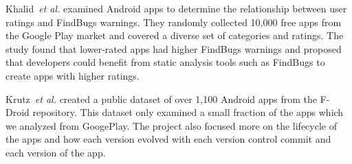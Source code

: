 




Khalid~\emph{et al.}\cite{7006337} examined Android apps to determine the relationship between user ratings and FindBugs warnings. They randomly collected 10,000 free apps from the Google Play market and covered a diverse set of categories and ratings. The study found that lower-rated apps had higher FindBugs warnings and proposed that developers could benefit from static analysis tools such as FindBugs to create apps with higher ratings.


Krutz~\emph{et al.}\cite{krutz2015FDroid} created a public dataset of over 1,100 Android apps from the F-Droid repository. This dataset only examined a small fraction of the apps which we analyzed from GoogePlay. The project also focused more on the lifecycle of the apps and how each version evolved with each version control commit and each version of the app.


